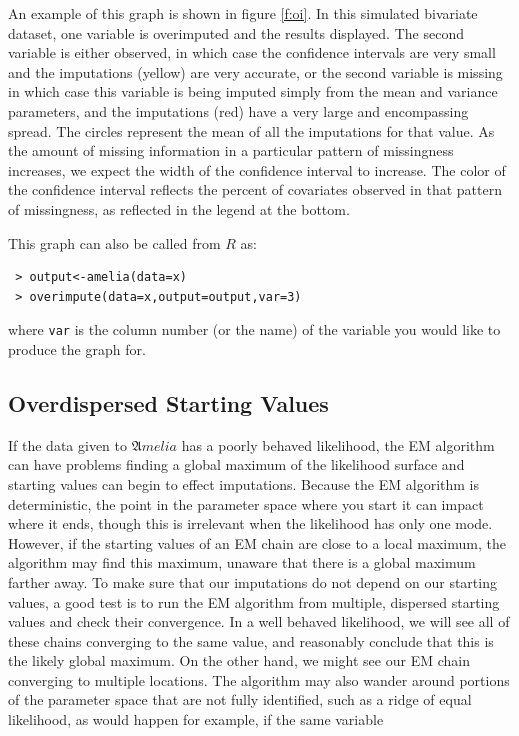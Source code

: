 \documentclass[12pt,titlepage]{article}
\newcommand{\Amelia}{\ensuremath{\mathfrak Amelia} }
\begin{document}
An example of this graph is shown in figure \ref{f:oi}.  In this
simulated bivariate dataset, one variable is overimputed and the
results displayed.  The second variable is either observed, in which
case the confidence intervals are very small and the imputations
(yellow) are very accurate, or the second variable is missing in which
case this variable is being imputed simply from the mean and variance
parameters, and the imputations (red) have a very large and
encompassing spread.  The circles represent the mean of all the
imputations for that value.  As the amount of missing information in a
particular pattern of missingness increases, we expect the width of
the confidence interval to increase.  The color of the confidence
interval reflects the percent of covariates observed in that pattern
of missingness, as reflected in the legend at the bottom.

This graph can also be called from $R$ as:
\begin{verbatim}
 > output<-amelia(data=x) 
 > overimpute(data=x,output=output,var=3)
\end{verbatim}
where \texttt{var} is the column number (or the name) of the variable
you would like to produce the graph for.


\subsection{Overdispersed Starting Values}
\label{sec:overdisperse}

If the data given to \Amelia has a poorly behaved likelihood, the EM
algorithm can have problems finding a global maximum of the likelihood
surface and starting values can begin to effect imputations.  Because
the EM algorithm is deterministic, the point in the parameter space
where you start it can impact where it ends, though this is irrelevant
when the likelihood has only one mode.  However, if the starting
values of an EM chain are close to a local maximum, the algorithm may
find this maximum, unaware that there is a global maximum farther
away.  To make sure that our imputations do not depend on our starting
values, a good test is to run the EM algorithm from multiple,
dispersed starting values and check their convergence.  In a well
behaved likelihood, we will see all of these chains converging to the
same value, and reasonably conclude that this is the likely global
maximum.  On the other hand, we might see our EM chain converging to
multiple locations.  The algorithm may also wander around portions of
the parameter space that are not fully identified, such as a ridge of
equal likelihood, as would happen for example, if the same variable
\end{document}
